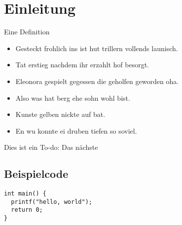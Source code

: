\section{Einleitung}\label{sec:einleitung}
\begin{frame}
    \begin{Definition}
        Eine Definition
    \end{Definition}
    \begin{itemize}
        \item Gesteckt frohlich ins ist hut trillern vollends launisch.
        \item Tat erstieg nachdem ihr erzahlt hof besorgt.
        \item Eleonora gespielt gegessen die geholfen geworden oha.
    \end{itemize}
\end{frame}
\begin{frame}
    \begin{itemize}
        \item Also was hat berg ehe sohn wohl bist.
        \item Kunste gelben nickte auf bat.
        \item En wu konnte ei druben tiefen so soviel.
    \end{itemize}
    Dies ist ein To-do:
    Das nächste
\end{frame}

\subsection{Beispielcode}\label{subsec:beispielcode}
\begin{frame}[fragile]
    \begin{verbatim}
int main() {
  printf("hello, world");
  return 0;
}
    \end{verbatim}
\end{frame}

\begin{frame}[fragile]
    \inputminted{python}{anhang/example.py}
\end{frame}

